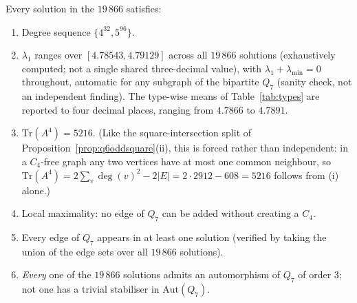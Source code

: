 \documentclass[12pt]{article}
\begin{document}
\begin{proposition}\label{prop:rigid}
Every solution in the $19\,866$ satisfies:
\begin{enumerate}[label=(\roman*)]
  \item Degree sequence $\{4^{32},5^{96}\}$.
  \item $\lambda_1$ ranges over $[4.78543,4.79129]$ across all $19\,866$
    solutions (exhaustively computed; not a single shared three-decimal
    value), with $\lambda_1+\lambda_{\min}=0$ throughout, automatic for any
    subgraph of the bipartite $Q_7$ (sanity check, not an independent
    finding). The type-wise means of Table~\ref{tab:types} are reported to four decimal
    places, ranging from $4.7866$ to $4.7891$.
  \item $\mathrm{Tr}(A^4)=5216$. (Like the square-intersection split of
    Proposition~\ref{prop:q6oddsquare}(ii), this is forced rather than
    independent: in a $C_4$-free graph any two vertices have at most one
    common neighbour, so
    $\mathrm{Tr}(A^4)=2\sum_v\deg(v)^2-2|E|=2\cdot2912-608=5216$ follows
    from (i) alone.)
  \item Local maximality: no edge of $Q_7$ can be added without creating a $C_4$.
  \item Every edge of $Q_7$ appears in at least one solution
    (verified by taking the union of the edge sets over all $19\,866$ solutions).
  \item \emph{Every} one of the $19\,866$ solutions admits an automorphism of
    $Q_7$ of order $3$; not one has a trivial stabiliser in
    $\mathrm{Aut}(Q_7)$.
\end{enumerate}
\end{proposition}
\end{document}
